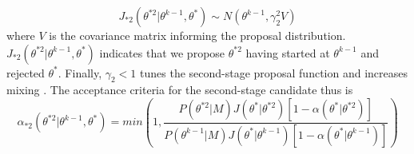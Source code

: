 \documentclass{article}
\begin{document}
\begin{equation} \label{eq:17mcmc}
J_{*2}(\theta^{*2}|\theta^{k-1},\theta^*) \sim N(\theta^{k-1}, \gamma_2^2V)
\end{equation} 
where $V$ is the covariance matrix informing the proposal distribution. $J_{*2}(\theta^{*2}|\theta^{k-1},\theta^*)$ indicates that we propose $\theta^{*2}$ having started at $\theta^{k-1}$ and rejected $\theta^*$. Finally, $\gamma_2 < 1$ tunes the second-stage proposal function and increases mixing \cite{smithCh8}. The acceptance criteria for the second-stage candidate thus is\\
\begin{equation} \label{eq:18mcmc}
\alpha_{*2}(\theta^{*2}|\theta^{k-1}, \theta^*) = min(1, \frac{P(\theta^{*2}|M)J(\theta^*|
    \theta^{*2})[1-\alpha(\theta^*|\theta^{*2})]}{P(\theta^{k-1}|M)J(\theta^*|\theta^{k-1})[1-\alpha(\theta^*|\theta^{k-1})]})
\end{equation}
\end{document}
